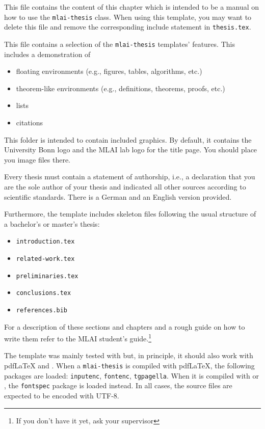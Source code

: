 \begin{description}[font=\normalfont\ttfamily]
	\item[setup.tex] This file contains the content of this chapter which is intended to be a manual on how to use the \texttt{mlai-thesis} class. When using this template, you may want to delete this file and remove the corresponding include statement in \texttt{thesis.tex}. 
	\item[feature-reel.tex] This file contains a selection of the \texttt{mlai-thesis} templates' features. This includes a demonstration of 
	\begin{itemize} 
		\item floating environments (e.g., figures, tables, algorithms, etc.) 
		\item theorem-like environments (e.g., definitions, theorems, proofs, etc.) 
		\item lists
		\item citations 
	\end{itemize}
	\item[gfx/*] This folder is intended to contain included graphics. By default, it contains the University Bonn logo and the MLAI lab logo for the title page. You should place you image files there. 
	\item[authorship-*.tex] Every thesis must contain a statement of authorship, i.e., a declaration that you are the sole author of your thesis and indicated all other sources according to scientific standards. There is a German and an English version provided. 
\end{description}

Furthermore, the template includes skeleton files following the usual structure 
of a bachelor's or master's thesis: 
\begin{itemize}
	\item \texttt{introduction.tex}
	\item \texttt{related-work.tex}
	\item \texttt{preliminaries.tex}
	\item \texttt{conclusions.tex}
	\item \texttt{references.bib}
\end{itemize}
For a description of these sections and chapters and a rough guide on how to write them refer to the MLAI student's guide.\footnote{If you don't have it yet, ask your supervisor} %

The template was mainly tested with \LuaLaTeX{} but, in principle, it should also work with {pdf\LaTeX{}} and \XeLaTeX{}. When a \texttt{mlai-thesis} is compiled with pdf\LaTeX{}, the following packages are loaded: \texttt{inputenc}, \texttt{fontenc}, \texttt{tgpagella}. When it is compiled with \LuaLaTeX{} or \XeLaTeX{}, the \texttt{fontspec} package is loaded instead. In all cases, the source files are expected to be encoded with UTF-8. 

